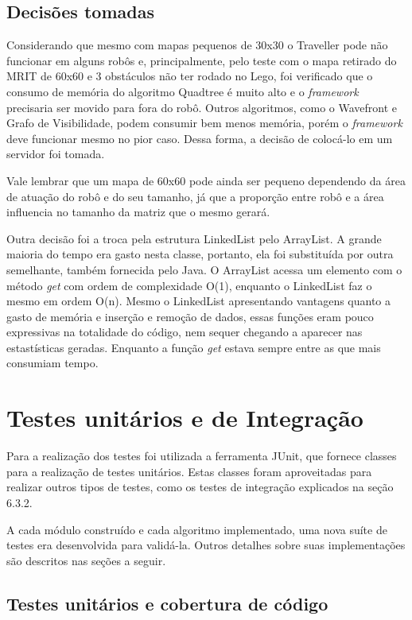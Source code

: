 \subsection{Decisões tomadas}

Considerando que mesmo com mapas pequenos de 30x30 o Traveller pode não funcionar em alguns robôs e, principalmente, pelo teste com o mapa retirado do MRIT de 60x60 e 3 obstáculos não ter rodado no Lego, foi verificado que o consumo de memória do algoritmo Quadtree é muito alto e o \textit{framework} precisaria ser movido para fora do robô. Outros algoritmos, como o Wavefront e Grafo de Visibilidade, podem consumir bem menos memória, porém o \textit{framework} deve funcionar mesmo no pior caso. Dessa forma, a decisão de colocá-lo em um servidor foi tomada.

Vale lembrar que um mapa de 60x60 pode ainda ser pequeno dependendo da área de atuação do robô e do seu tamanho, já que a proporção entre robô e a área influencia no tamanho da matriz que o mesmo gerará.

Outra decisão foi a troca pela estrutura LinkedList pelo ArrayList. A grande maioria do tempo era gasto nesta classe, portanto, ela foi substituída por outra semelhante, também fornecida pelo Java. O ArrayList acessa um elemento com o método \textit{get} com ordem de complexidade O(1), enquanto o LinkedList faz o mesmo em ordem O(n). Mesmo o LinkedList apresentando vantagens quanto a gasto de memória e inserção e remoção de dados, essas funções eram pouco expressivas na totalidade do código, nem sequer chegando a aparecer nas estastísticas geradas. Enquanto a função \textit{get} estava sempre entre as que mais consumiam tempo.

\section{Testes unitários e de Integração}

Para a realização dos testes foi utilizada a ferramenta JUnit, que fornece classes para a realização de testes unitários. Estas classes foram aproveitadas para realizar outros tipos de testes, como os testes de integração explicados na seção 6.3.2.

A cada módulo construído e cada algoritmo implementado, uma nova suíte de testes era desenvolvida para validá-la. Outros detalhes sobre suas implementações são descritos nas seções a seguir.

\subsection{Testes unitários e cobertura de código}

